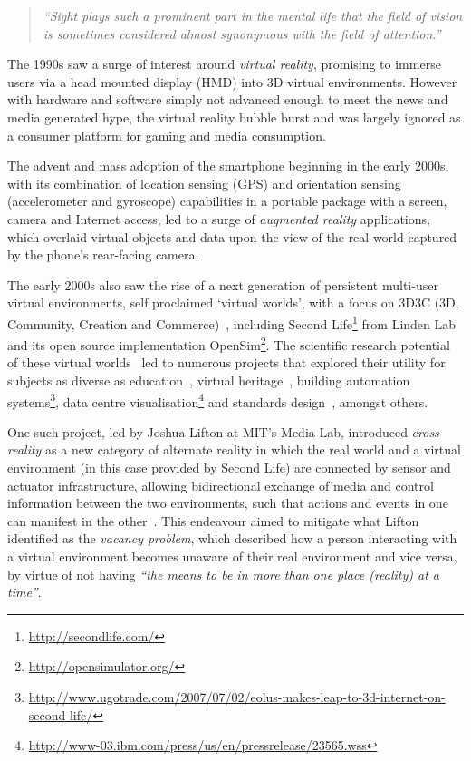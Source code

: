 \begin{quote}
	\textit{``Sight plays such a prominent part in the mental life that the field of vision is sometimes considered almost synonymous with the field of attention.''}~\cite{Lucas1951}
\end{quote}

The 1990s saw a surge of interest around \textit{virtual reality}, promising to immerse users via a head mounted display (HMD) into 3D virtual environments. However with hardware and software simply not advanced enough to meet the news and media generated hype, the virtual reality bubble burst and was largely ignored as a consumer platform for gaming and media consumption.

The advent and mass adoption of the smartphone beginning in the early 2000s, with its combination of location sensing (GPS) and orientation sensing (accelerometer and gyroscope) capabilities in a portable package with a screen, camera and Internet access, led to a surge of \textit{augmented reality} applications, which overlaid virtual objects and data upon the view of the real world captured by the phone's rear-facing camera.

The early 2000s also saw the rise of a next generation of persistent multi-user virtual environments, self proclaimed `virtual worlds', with a focus on 3D3C (3D, Community, Creation and Commerce)~\cite{Sevan2008}, including Second Life\footnote{\url{http://secondlife.com/}} from Linden Lab and its open source implementation OpenSim\footnote{\url{http://opensimulator.org/}}. The scientific research potential of these virtual worlds~\cite{Bainbridge2007} led to numerous projects that explored their utility for subjects as diverse as education~\cite{Allison2012}, virtual heritage~\cite{Kennedy2013}, building automation systems\footnote{\url{http://www.ugotrade.com/2007/07/02/eolus-makes-leap-to-3d-internet-on-second-life/}}, data centre visualisation\footnote{\url{http://www-03.ibm.com/press/us/en/pressrelease/23565.wss}} and standards design~\cite{Gelissen2011a}, amongst others.

One such project, led by Joshua Lifton at MIT's Media Lab, introduced \textit{cross reality} as a new category of alternate reality in which the real world and a virtual environment (in this case provided by Second Life) are connected by sensor and actuator infrastructure, allowing bidirectional exchange of media and control information between the two environments, such that actions and events in one can manifest in the other~\cite{Lifton2007a}. This endeavour aimed to mitigate what Lifton identified as the \textit{vacancy problem}, which described how a person interacting with a virtual environment becomes unaware of their real environment and vice versa, by virtue of not having \textit{``the means to be in more than one place (reality) at a time''}.

